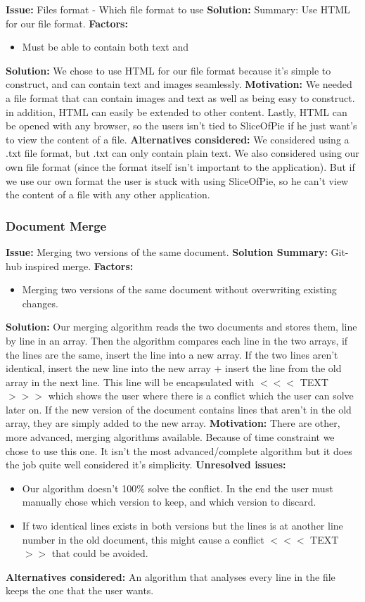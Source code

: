 \documentclass[11pt]{article}
\begin{document}
    \textbf{Issue:} Files format - Which file format to use
    \textbf{Solution:} Summary: Use HTML for our file format.
    \textbf{Factors:}
\begin{itemize}
\item Must be able to contain both text and
\end{itemize}
    \textbf{Solution:}
    We chose to use HTML for our file format because it's simple to construct, and can contain text and images seamlessly. 
    \textbf{Motivation:}
    We needed a file format that can contain images and text as well as being easy to construct. in addition, HTML can easily be extended to other content. 
    Lastly, HTML can be opened with any browser, so the users isn't tied to SliceOfPie if he just want's to view the content of a file.
    \textbf{Alternatives considered:}
    We considered using a .txt file format, but .txt can only contain plain text.
    We also considered using our own file format (since the format itself isn't important to the application). But if we use our own format the user is stuck
    with using SliceOfPie, so he can't view the content of a file with any other application.
\subsubsection{Document Merge}
\label{sec-3-3-2}

    \textbf{Issue:} Merging two versions of the same document.
    \textbf{Solution Summary:} Git-hub inspired merge.
    \textbf{Factors:}
\begin{itemize}
\item Merging two versions of the same document without overwriting existing changes.
\end{itemize}
    \textbf{Solution:}
    Our merging algorithm reads the two documents and stores them, line by line in an array. 
    Then the algorithm compares each line in the two arrays, if the lines are the same, insert the line into a new array. If the two lines aren't identical, 
    insert the new line into the new array + insert the line from the old array in the next line. This line will be encapsulated with $<<<$ TEXT $>>>$ which 
    shows the user where there is a conflict which the user can solve later on. 
    If the new version of the document contains lines that aren't in the old array, they are simply added to the new array. 
    \textbf{Motivation:}
    There are other, more advanced, merging algorithms available. Because of time constraint we chose to use this one. It isn't the most advanced/complete algorithm 
    but it does the job quite well considered it's simplicity.
    \textbf{Unresolved issues:}
\begin{itemize}
\item Our algorithm doesn't 100\% solve the conflict. In the end the user must manually chose which
      version to keep, and which version to discard.
\item If two identical lines exists in both versions but the lines is at another line number in the old
      document, this might cause a conflict $<<<$ TEXT $>>$ that could be avoided.
\end{itemize}
    \textbf{Alternatives considered:}
    An algorithm that analyses every line in the file keeps the one that the user wants.
\end{document}
